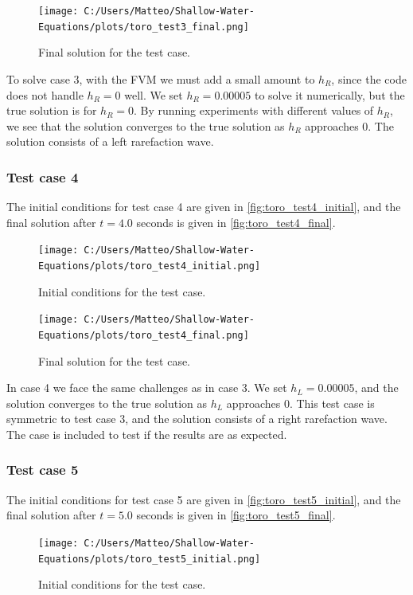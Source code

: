 \begin{figure}[H]
    \centering
    \texttt{[image: C:/Users/Matteo/Shallow-Water-Equations/plots/toro\_test3\_final.png]}
    \caption{Final solution for the test case.}\label{fig:toro_test3_final}
\end{figure}
To solve case 3, with the FVM we must add a small amount to $h_R$, since the code does not handle $h_R = 0$ well.
We set $h_R = 0.00005$ to solve it numerically, but the true solution is for $h_R = 0$.
By running experiments with different values of $h_R$, we see that the solution converges to the true solution as $h_R$ approaches 0.
The solution consists of a left rarefaction wave.

\subsubsection*{Test case 4}
The initial conditions for test case 4 are given in \autoref{fig:toro_test4_initial}, and the final solution after $t=4.0$ seconds is given in \autoref{fig:toro_test4_final}.
\begin{figure}[H]
    \centering
    \texttt{[image: C:/Users/Matteo/Shallow-Water-Equations/plots/toro\_test4\_initial.png]}
    \caption{Initial conditions for the test case.}\label{fig:toro_test4_initial}
\end{figure}

\begin{figure}[H]
    \centering
    \texttt{[image: C:/Users/Matteo/Shallow-Water-Equations/plots/toro\_test4\_final.png]}
    \caption{Final solution for the test case.}\label{fig:toro_test4_final}
\end{figure}
In case 4 we face the same challenges as in case 3.
We set $h_L = 0.00005$, and the solution converges to the true solution as $h_L$ approaches 0.
This test case is symmetric to test case 3, and the solution consists of a right rarefaction wave.
The case is included to test if the results are as expected.

\subsubsection*{Test case 5}
The initial conditions for test case 5 are given in \autoref{fig:toro_test5_initial}, and the final solution after $t=5.0$ seconds is given in \autoref{fig:toro_test5_final}.
\begin{figure}[H]
    \centering
    \texttt{[image: C:/Users/Matteo/Shallow-Water-Equations/plots/toro\_test5\_initial.png]}
    \caption{Initial conditions for the test case.}\label{fig:toro_test5_initial}
\end{figure}

